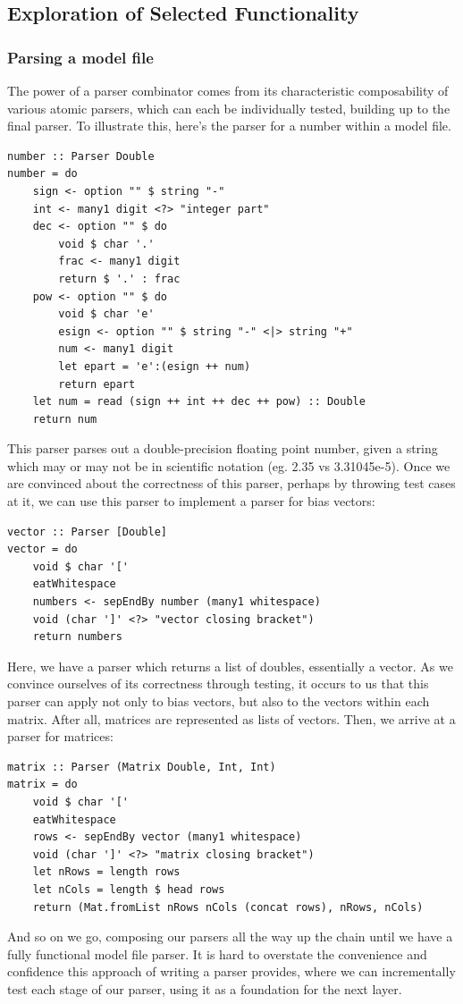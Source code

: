 \documentclass[12pt]{article}
\begin{document}
\subsection{Exploration of Selected Functionality}
\subsubsection{Parsing a model file}
The power of a parser combinator comes from its characteristic composability of various atomic parsers, which can each be individually tested, building up to the final parser. To illustrate this, here's the parser for a number within a model file.
\begin{lstlisting}
number :: Parser Double
number = do
	sign <- option "" $ string "-"
	int <- many1 digit <?> "integer part"
	dec <- option "" $ do
		void $ char '.'
		frac <- many1 digit
		return $ '.' : frac
	pow <- option "" $ do
		void $ char 'e'
		esign <- option "" $ string "-" <|> string "+"
		num <- many1 digit
		let epart = 'e':(esign ++ num)
		return epart
	let num = read (sign ++ int ++ dec ++ pow) :: Double
	return num	
\end{lstlisting}
This parser parses out a double-precision floating point number, given a string which may or may not be in scientific notation (eg. 2.35 vs 3.31045e-5). Once we are convinced about the correctness of this parser, perhaps by throwing test cases at it, we can use this parser to implement a parser for bias vectors:
\begin{lstlisting}
vector :: Parser [Double]
vector = do
	void $ char '['
	eatWhitespace
	numbers <- sepEndBy number (many1 whitespace)
	void (char ']' <?> "vector closing bracket")
	return numbers
\end{lstlisting}
Here, we have a parser which returns a list of doubles, essentially a vector. As we convince ourselves of its correctness through testing, it occurs to us that this parser can apply not only to bias vectors, but also to the vectors within each matrix. After all, matrices are represented as lists of vectors. Then, we arrive at a parser for matrices:
\begin{lstlisting}
matrix :: Parser (Matrix Double, Int, Int)
matrix = do
	void $ char '['
	eatWhitespace
	rows <- sepEndBy vector (many1 whitespace)
	void (char ']' <?> "matrix closing bracket")
	let nRows = length rows
	let nCols = length $ head rows
	return (Mat.fromList nRows nCols (concat rows), nRows, nCols)
\end{lstlisting}
And so on we go, composing our parsers all the way up the chain until we have a fully functional model file parser. It is hard to overstate the convenience and confidence this approach of writing a parser provides, where we can incrementally test each stage of our parser, using it as a foundation for the next layer.
\end{document}
